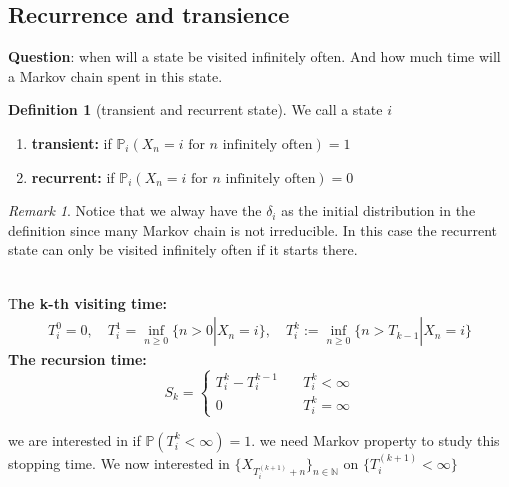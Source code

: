 \documentclass[a4paper,11pt]{book}
\theoremstyle{definition}
\newtheorem{definition}{Definition}[section]
\theoremstyle{remark}
\newtheorem*{remark}{Remark}
\begin{document}
\subsection{Recurrence and transience}
\textbf{Question}: when will a state be visited infinitely often. And how much time will a Markov chain spent in this state. 

\begin{definition}[transient and recurrent state]
	We call a state $i$
	\begin{enumerate}
		\item \textbf{transient:} if $\mathbb{P}_i(X_n = i \text{ for $n$ infinitely often}) = 1$
		\item \textbf{recurrent:} if $\mathbb{P}_i(X_n = i \text{ for $n$ infinitely often}) = 0$
	\end{enumerate}
\end{definition}
\begin{remark}
Notice that we alway have the $\delta_i$ as the initial distribution in the definition since many Markov chain is not irreducible. In this case the recurrent state can only be visited infinitely often if it starts there.	
\end{remark}

\quad\\
T\textbf{he k-th visiting time:} 
\begin{align*}
	T_i^0 = 0, \quad
	T_i^1 = \inf_{n \geq 0} \{ n > 0 | X_n = i\}, \quad
	T^{k}_i:= \inf_{n \ge 0} \{n > T_{k-1}| X_n = i \} 
\end{align*}
\textbf{The recursion time:}
\begin{equation*}
	S_k = \left\{
	\begin{aligned}
		T^k_i - T^{k-1}_i\quad &T^k_i < \infty \\
		0 \quad & T^k_i = \infty
	\end{aligned}
	\right.
\end{equation*}

we are interested in if $\mathbb{P}(T_i^k < \infty) = 1$. we need Markov property to study this stopping time. We now interested in $\{X_{T_i^{(k+1)}+ n}\}_{n \in \mathbb{N}}$ on $\{ T_i^{(k+1)} < \infty \}$
\end{document}
